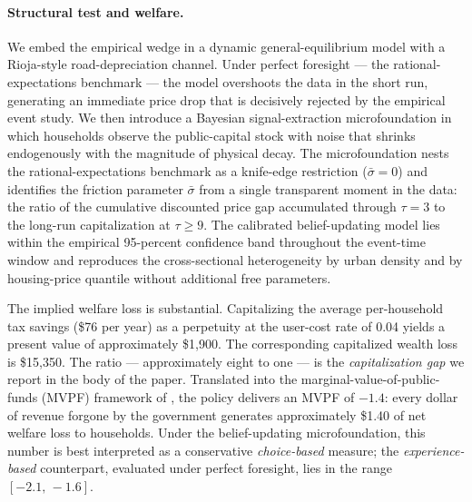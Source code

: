 \paragraph{Structural test and welfare.}
We embed the empirical wedge in a dynamic general-equilibrium model with a Rioja-style road-depreciation channel. Under perfect foresight --- the rational-expectations benchmark --- the model overshoots the data in the short run, generating an immediate price drop that is decisively rejected by the empirical event study. We then introduce a Bayesian signal-extraction microfoundation in which households observe the public-capital stock with noise that shrinks endogenously with the magnitude of physical decay. The microfoundation nests the rational-expectations benchmark as a knife-edge restriction ($\bar{\sigma} = 0$) and identifies the friction parameter $\bar{\sigma}$ from a single transparent moment in the data: the ratio of the cumulative discounted price gap accumulated through $\tau = 3$ to the long-run capitalization at $\tau \geq 9$. The calibrated belief-updating model lies within the empirical 95-percent confidence band throughout the event-time window and reproduces the cross-sectional heterogeneity by urban density and by housing-price quantile without additional free parameters.

The implied welfare loss is substantial. Capitalizing the average per-household tax savings (\$76 per year) as a perpetuity at the user-cost rate of 0.04 yields a present value of approximately \$1,900. The corresponding capitalized wealth loss is \$15,350. The ratio --- approximately eight to one --- is the {\it capitalization gap} we report in the body of the paper. Translated into the marginal-value-of-public-funds (MVPF) framework of \citet{hendren2020unified}, the policy delivers an MVPF of $-1.4$: every dollar of revenue forgone by the government generates approximately \$1.40 of net welfare loss to households. Under the belief-updating microfoundation, this number is best interpreted as a conservative {\it choice-based} measure; the {\it experience-based} counterpart, evaluated under perfect foresight, lies in the range $[-2.1,\, -1.6]$.

